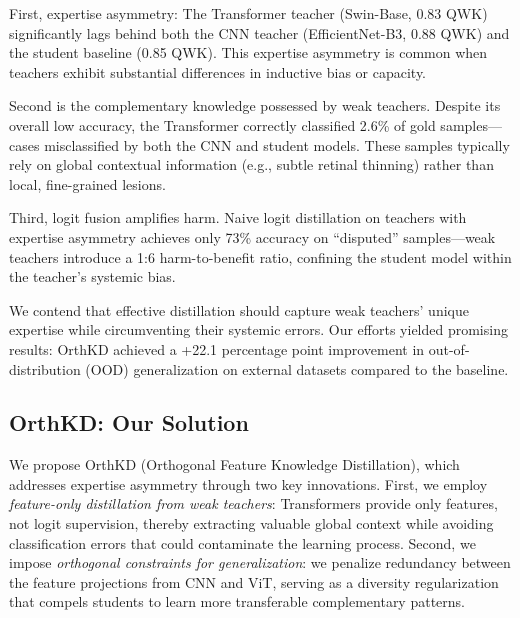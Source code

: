 \documentclass{article}
\begin{document}
First, expertise asymmetry: The Transformer teacher (Swin-Base, 0.83 QWK) significantly lags behind both the CNN teacher (EfficientNet-B3, 0.88 QWK) and the student baseline (0.85 QWK). This expertise asymmetry is common when teachers exhibit substantial differences in inductive bias or capacity.

Second is the complementary knowledge possessed by weak teachers. Despite its overall low accuracy, the Transformer correctly classified 2.6\% of gold samples—cases misclassified by both the CNN and student models. These samples typically rely on global contextual information (e.g., subtle retinal thinning) rather than local, fine-grained lesions.

Third, logit fusion amplifies harm. Naive logit distillation on teachers with expertise asymmetry achieves only 73\% accuracy on “disputed” samples—weak teachers introduce a 1:6 harm-to-benefit ratio, confining the student model within the teacher's systemic bias.

We contend that effective distillation should capture weak teachers' unique expertise while circumventing their systemic errors. Our efforts yielded promising results: OrthKD achieved a +22.1 percentage point improvement in out-of-distribution (OOD) generalization on external datasets compared to the baseline.

\subsection{OrthKD: Our Solution}
We propose OrthKD (Orthogonal Feature Knowledge Distillation), which addresses expertise asymmetry through two key innovations. First, we employ \textit{feature-only distillation from weak teachers}: Transformers provide only features, not logit supervision, thereby extracting valuable global context while avoiding classification errors that could contaminate the learning process. Second, we impose \textit{orthogonal constraints for generalization}: we penalize redundancy between the feature projections from CNN and ViT, serving as a diversity regularization that compels students to learn more transferable complementary patterns.
\end{document}
